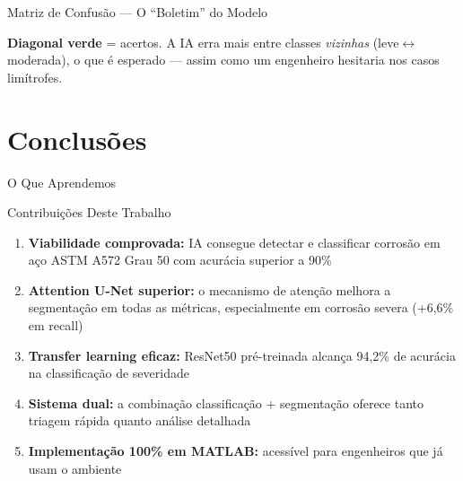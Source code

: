 \documentclass[aspectratio=169, 12pt]{beamer}
\begin{document}
\begin{frame}{Matriz de Confusão --- O ``Boletim'' do Modelo}
\begin{center}
    \end{center}

    \vspace{0.2cm}

    {\small \textcolor{verdepositivo}{\textbf{Diagonal verde}} = acertos. A IA erra mais entre classes \textit{vizinhas} (leve$\leftrightarrow$moderada), o que é esperado --- assim como um engenheiro hesitaria nos casos limítrofes.}
\end{frame}

\section{Conclusões}

\begin{frame}{O Que Aprendemos}
    \begin{block}{Contribuições Deste Trabalho}
        \begin{enumerate}
            \item \textbf{Viabilidade comprovada:} IA consegue detectar e classificar corrosão em aço ASTM A572 Grau 50 com acurácia superior a 90\%

            \item \textbf{Attention U-Net superior:} o mecanismo de atenção melhora a segmentação em todas as métricas, especialmente em corrosão severa (+6,6\% em recall)

            \item \textbf{Transfer learning eficaz:} ResNet50 pré-treinada alcança 94,2\% de acurácia na classificação de severidade

            \item \textbf{Sistema dual:} a combinação classificação + segmentação oferece tanto triagem rápida quanto análise detalhada

            \item \textbf{Implementação 100\% em MATLAB:} acessível para engenheiros que já usam o ambiente
        \end{enumerate}
    \end{block}
\end{frame}
\end{document}
